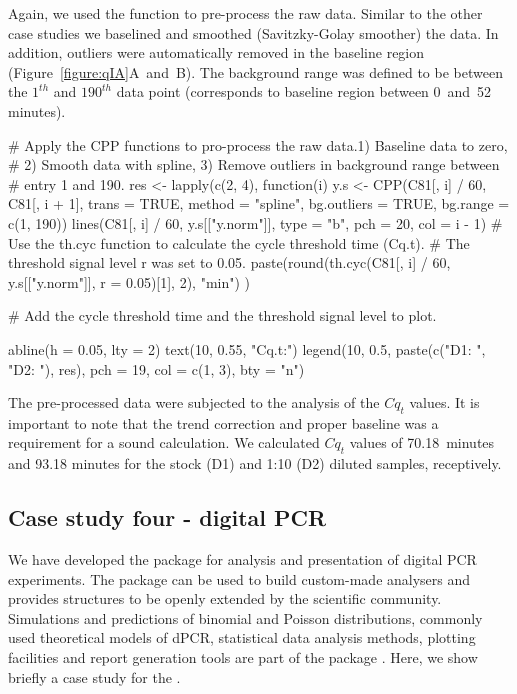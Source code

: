 Again, we used the  function to pre-process the raw data. Similar to 
the other case studies we baselined and smoothed (Savitzky-Golay smoother) the 
data. In addition, outliers were automatically removed in the baseline region 
(Figure~\ref{figure:qIA}A~and~B). The background range was defined to be between 
the $1^{th}$ and $190^{th}$ data point (corresponds to baseline region between 
0~and~52 minutes).

\begin{example}
  # Apply the CPP functions to pro-process the raw data.1) Baseline data to zero, 
  # 2) Smooth data with spline, 3) Remove outliers in background range between 
  # entry 1 and 190.
res <- lapply(c(2, 4), function(i) {
  y.s <- CPP(C81[, i] / 60, C81[, i + 1],
             trans = TRUE, 
             method = "spline",
             bg.outliers = TRUE,
             bg.range = c(1, 190))
  lines(C81[, i] / 60, y.s[["y.norm"]], type = "b", pch = 20, col = i - 1)
  # Use the th.cyc function to calculate the cycle threshold time (Cq.t). 
  # The threshold signal level r was set to 0.05.
  paste(round(th.cyc(C81[, i] / 60, y.s[["y.norm"]], r = 0.05)[1], 2), "min")
})

# Add the cycle threshold time and the threshold signal level to plot.

abline(h = 0.05, lty = 2)
text(10, 0.55, "Cq.t:")
legend(10, 0.5, paste(c("D1: ", "D2: "), res), pch = 19, col = c(1, 3), 
       bty = "n")
\end{example}

The pre-processed data were subjected to the analysis of the $Cq_{t}$ values. It 
is important to note that the trend correction and proper baseline was a 
requirement for a sound calculation. We calculated $Cq_{t}$ 
values of 70.18~minutes and 93.18 minutes for the stock (D1) and 1:10 (D2) 
diluted samples, receptively.

\subsection{Case study four - digital PCR}

We have developed the  package for analysis and presentation of 
digital PCR experiments. The  package can be used to build 
custom-made analysers and provides structures to be openly extended by the 
scientific community. Simulations and predictions of binomial and Poisson 
distributions, commonly used theoretical models of dPCR, statistical data 
analysis methods, plotting facilities and report generation tools are part of 
the package \citep{pabinger_2014}. Here, we show briefly a case study for the 
.

